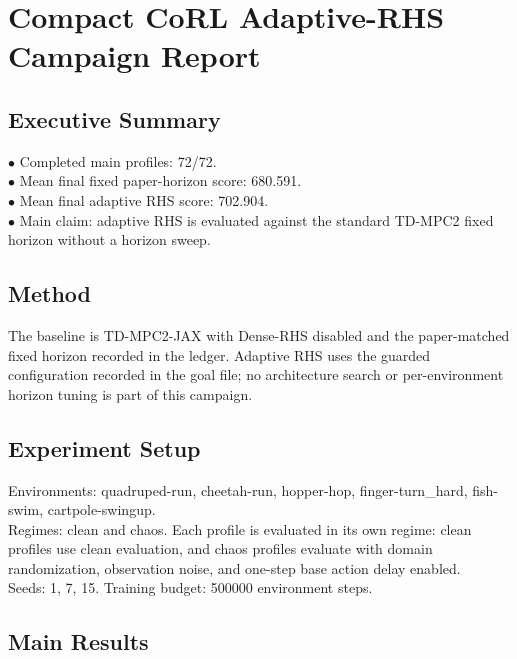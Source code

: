 \documentclass{article}
\begin{document}
\section*{Compact CoRL Adaptive-RHS Campaign Report}

\subsection*{Executive Summary}

\noindent $\bullet$ Completed main profiles: 72/72.\\
\noindent $\bullet$ Mean final fixed paper-horizon score: 680.591.\\
\noindent $\bullet$ Mean final adaptive RHS score: 702.904.\\
\noindent $\bullet$ Main claim: adaptive RHS is evaluated against the standard TD-MPC2 fixed horizon without a horizon sweep.\\

\subsection*{Method}

The baseline is TD-MPC2-JAX with Dense-RHS disabled and the paper-matched fixed horizon recorded in the ledger. Adaptive RHS uses the guarded configuration recorded in the goal file; no architecture search or per-environment horizon tuning is part of this campaign.\\

\subsection*{Experiment Setup}

Environments: quadruped-run, cheetah-run, hopper-hop, finger-turn\_hard, fish-swim, cartpole-swingup.\\

Regimes: clean and chaos. Each profile is evaluated in its own regime: clean profiles use clean evaluation, and chaos profiles evaluate with domain randomization, observation noise, and one-step base action delay enabled.\\

Seeds: 1, 7, 15. Training budget: 500000 environment steps.\\

\subsection*{Main Results}
\end{document}
